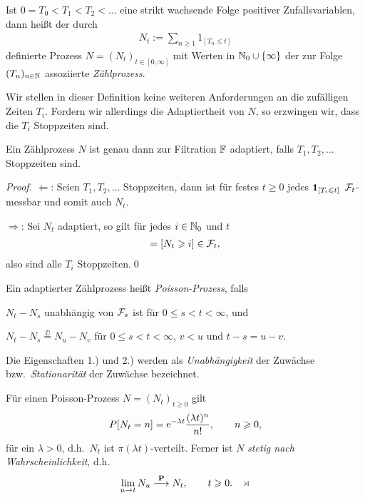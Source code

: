 \begin{defn}
\label{defn:1.13}
Ist $0=T_0 < T_1 < T_2 < \ldots $ eine strikt wachsende Folge positiver
Zufallsvariablen, dann heißt der durch 
\begin{align*}
N_t:= \sum_{n\ge 1} 1_{[T_n \le t]}
\end{align*}
definierte Prozess $N=(N_t)_{t \in [0,\infty]}$ mit Werten in $\mathbb{N}_0 \cup
\{\infty\}$ der zur Folge $(T_n)_{n\in\mathbb{N}}$ assoziierte
\emph{Zählprozess}.\fish
\end{defn}

Wir stellen in dieser Definition keine weiteren Anforderungen an die zufälligen
Zeiten $T_i$. Fordern wir allerdings die Adaptiertheit von $N$, so erzwingen
wir, dass die $T_i$ Stoppzeiten sind.

\begin{prop}
\label{prop:1.20}
Ein Zählprozess $N$ ist genau dann zur Filtration $\mathbb{F}$ adaptiert, falls
$T_1,T_2,\ldots$ Stoppzeiten sind.\fish
\end{prop}
\begin{proof}
$\Leftarrow$: Seien $T_1,T_2,\ldots$ Stoppzeiten, dann ist für festes $t\ge 0$
jedes $\mathbf{1}_{[T_i\leqslant t]}$ $\mathcal{F}_t$-messbar und somit auch $N_t$.

$\Rightarrow$: Sei $N_t$ adaptiert, so gilt für jedes $i\in\mathbb{N}_0$ und $t$
\begin{align*}
[T_i\le t] = [N_t\ge i] \in \FF_t,
\end{align*}
also sind alle $T_i$ Stoppzeiten.\qed
\end{proof}

\begin{defn}
\label{defn:1.14}
Ein adaptierter Zählprozess heißt \emph{Poisson-Prozess}, falls
\begin{defnenum}
\item $N_t-N_s$ unabhängig von
  $\mathcal{F}_s$ ist  für $0 \le s < t <\infty$, und
\item
$N_t-N_s\overset{\DD}{=} N_{u}-N_{v}$ für $0 \le s < t < \infty$,  $v < u$ und
$t-s = u-v$.~\fish
\end{defnenum}
\end{defn}

Die Eigenschaften 1.) und 2.) werden als \emph{Unabhängigkeit} der Zuwächse
bzw.\ \emph{Stationarität} der Zuwächse bezeichnet.

\begin{prop}
\label{prop:1.21}
Für einen Poisson-Prozess $N=(N_t)_{t\ge 0}$ gilt
\begin{align*}
P[N_t = n] = \mathrm{e}^{-\lambda t}\frac{(\lambda t)^n}{n!},\qquad n\geqslant
0,
\end{align*}
für ein $\lambda > 0$, d.h.\ $N_t$ ist $\pi(\lambda t)$-verteilt. 
Ferner ist $N$ \emph{stetig nach Wahrscheinlichkeit}, d.h.
\begin{align*}
\lim_{u\to t} N_u \Pto N_t,\qquad t\ge 0.\fish
\end{align*}
\end{prop}

